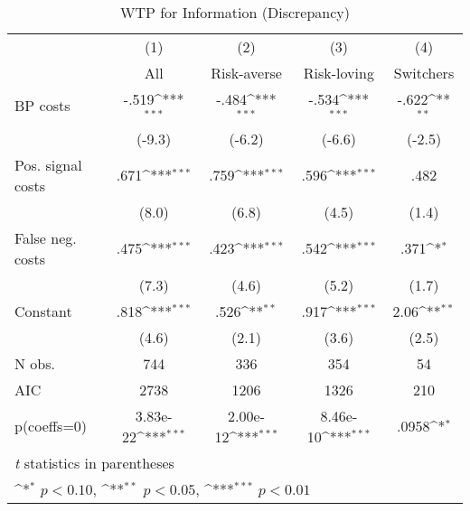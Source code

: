 \begin{table}[htbp]\centering
\def\sym#1{\ifmmode^{#1}\else\(^{#1}\)\fi}
\caption{WTP for Information (Discrepancy)}
\begin{tabular}{l*{4}{c}}
\hline\hline
                &\multicolumn{1}{c}{(1)}&\multicolumn{1}{c}{(2)}&\multicolumn{1}{c}{(3)}&\multicolumn{1}{c}{(4)}\\
                &\multicolumn{1}{c}{All}&\multicolumn{1}{c}{Risk-averse}&\multicolumn{1}{c}{Risk-loving}&\multicolumn{1}{c}{Switchers}\\
\hline
BP costs        &    -.519\sym{***}&    -.484\sym{***}&    -.534\sym{***}&    -.622\sym{**} \\
                &   (-9.3)         &   (-6.2)         &   (-6.6)         &   (-2.5)         \\
Pos. signal costs&     .671\sym{***}&     .759\sym{***}&     .596\sym{***}&     .482         \\
                &    (8.0)         &    (6.8)         &    (4.5)         &    (1.4)         \\
False neg. costs&     .475\sym{***}&     .423\sym{***}&     .542\sym{***}&     .371\sym{*}  \\
                &    (7.3)         &    (4.6)         &    (5.2)         &    (1.7)         \\
Constant        &     .818\sym{***}&     .526\sym{**} &     .917\sym{***}&     2.06\sym{**} \\
                &    (4.6)         &    (2.1)         &    (3.6)         &    (2.5)         \\
\hline
N obs.          &      744         &      336         &      354         &       54         \\
AIC             &     2738         &     1206         &     1326         &      210         \\
p(coeffs=0)     & 3.83e-22\sym{***}& 2.00e-12\sym{***}& 8.46e-10\sym{***}&    .0958\sym{*}  \\
\hline\hline
\multicolumn{5}{l}{\footnotesize \textit{t} statistics in parentheses}\\
\multicolumn{5}{l}{\footnotesize \sym{*} \(p<0.10\), \sym{**} \(p<0.05\), \sym{***} \(p<0.01\)}\\
\end{tabular}
\end{table}
